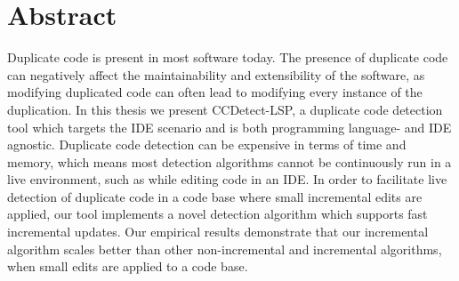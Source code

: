 \chapter*{Abstract} 

Duplicate code is present in most software today. The presence of duplicate code can
negatively affect the maintainability and extensibility of the software, as modifying
duplicated code can often lead to modifying every instance of the duplication. In this
thesis we present CCDetect\nobreakdash-LSP, a duplicate code detection tool which targets
the IDE scenario and is both programming language- and IDE agnostic. Duplicate code
detection can be expensive in terms of time and memory, which means most detection
algorithms cannot be continuously run in a live environment, such as while editing code in
an IDE. In order to facilitate live detection of duplicate code in a code base where small
incremental edits are applied, our tool implements a novel detection algorithm which
supports fast incremental updates. Our empirical results demonstrate that our incremental
algorithm scales better than other non-incremental and incremental algorithms, when small
edits are applied to a code base.
